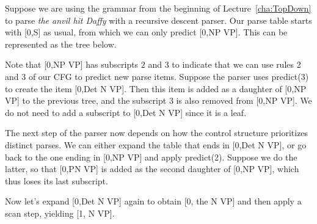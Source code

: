 \begin{examplebox}
Suppose we are using the grammar from the beginning of Lecture~\ref{cha:TopDown} to parse \emph{the anvil hit Daffy} with a recursive descent parser.
Our parse table starts with [0,\psep S] as usual, from which we can only predict [0,\psep NP VP].
This can be represented as the tree below.
%
\begin{center}
\end{center}
%
Note that [0,\psep NP VP] has subscripts $2$ and $3$ to indicate that we can use rules 2 and 3 of our CFG to predict new parse items.
Suppose the parser uses predict(3) to create the item [0,\psep Det N VP].
Then this item is added as a daughter of [0,\psep NP VP] to the previous tree, and the subscript 3 is also removed from [0,\psep NP VP].
We do not need to add a subscript to [0,\psep Det N VP] since it is a leaf.
%
\begin{center}
\end{center}
%
The next step of the parser now depends on how the control structure prioritizes distinct parses.
We can either expand the table that ends in [0,\psep Det N VP], or go back to the one ending in [0,\psep NP VP] and apply predict(2).
Suppose we do the latter, so that [0,\psep PN VP] is added as the second daughter of [0,\psep NP VP], which thus loses its last subscript.
%
\begin{center}
\end{center}
%
Now let's expand [0,\psep Det N VP] again to obtain [0, \psep the N VP] and then apply a scan step, yielding [1, \psep N VP].
%
\begin{center}

\end{center}
\end{examplebox}
